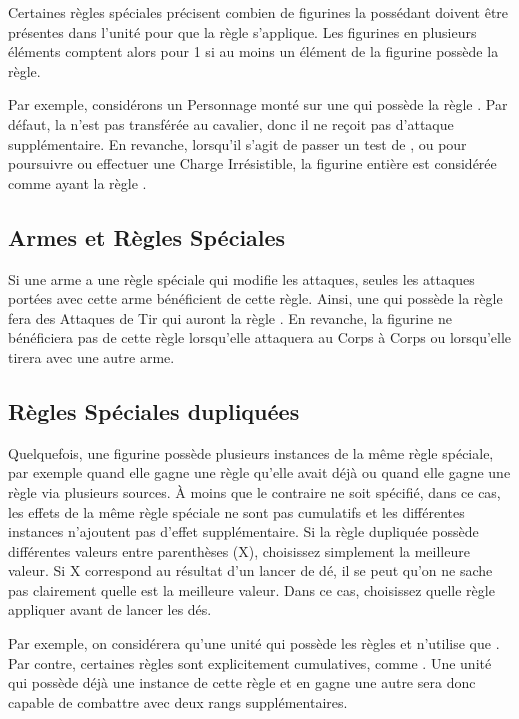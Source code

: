Certaines règles spéciales précisent combien de figurines la possédant doivent être présentes dans l'unité pour que la règle s'applique. Les figurines en plusieurs éléments comptent alors pour 1 si au moins un élément de la figurine possède la règle.

Par exemple, considérons un Personnage monté sur une \monstrousbeast{} qui possède la règle \frenzy{}. Par défaut, la \frenzy{} n'est pas transférée au cavalier, donc il ne reçoit pas d'attaque supplémentaire. En revanche, lorsqu'il s'agit de passer un test de \frenzy{}, ou pour poursuivre ou effectuer une Charge Irrésistible, la figurine entière est considérée comme ayant la règle \frenzy{}.

\subsection{Armes et Règles Spéciales}

Si une arme a une règle spéciale qui modifie les attaques, seules les attaques portées avec cette arme bénéficient de cette règle. Ainsi, une \handgun{} qui possède la règle \armourpiercing{} fera des Attaques de Tir qui auront la règle \armourpiercing{}. En revanche, la figurine ne bénéficiera pas de cette règle lorsqu'elle attaquera au Corps à Corps ou lorsqu'elle tirera avec une autre arme.

\subsection{Règles Spéciales dupliquées}

Quelquefois, une figurine possède plusieurs instances de la même règle spéciale, par exemple quand elle gagne une règle qu'elle avait déjà ou quand elle gagne une règle via plusieurs sources. À moins que le contraire ne soit spécifié, dans ce cas, les effets de la même règle spéciale ne sont pas cumulatifs et les différentes instances n'ajoutent pas d'effet supplémentaire. Si la règle dupliquée possède différentes valeurs entre parenthèses (X), choisissez simplement la meilleure valeur. Si X correspond au résultat d'un lancer de dé, il se peut qu'on ne sache pas clairement quelle est la meilleure valeur. Dans ce cas, choisissez quelle règle appliquer avant de lancer les dés.

Par exemple, on considérera qu'une unité qui possède les règles  et  n'utilise que . Par contre, certaines règles sont explicitement cumulatives, comme \fightinextrarank{}. Une unité qui possède déjà une instance de cette règle et en gagne une autre sera donc capable de combattre avec deux rangs supplémentaires. 
